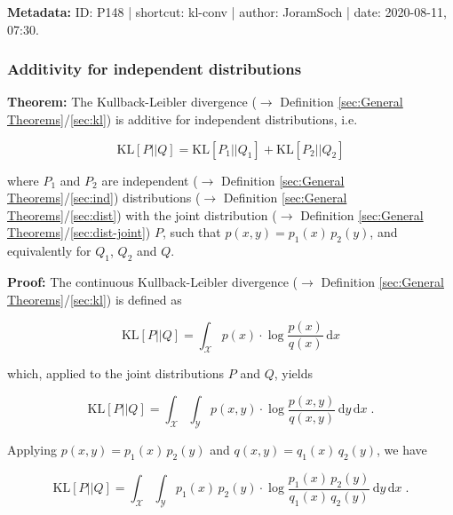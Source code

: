 \documentclass[a4paper,12pt,twoside]{book}
\begin{document}
\vspace{1em}
\textbf{Metadata:} ID: P148 | shortcut: kl-conv | author: JoramSoch | date: 2020-08-11, 07:30.
\vspace{1em}



\subsubsection[\textbf{Additivity for independent distributions}]{Additivity for independent distributions} \label{sec:kl-add}
\setcounter{equation}{0}

\textbf{Theorem:} The Kullback-Leibler divergence ($\rightarrow$ Definition \ref{sec:General Theorems}/\ref{sec:kl}) is additive for independent distributions, i.e.

\begin{equation} \label{eq:kl-add-KL-add}
\mathrm{KL}[P||Q] = \mathrm{KL}[P_1||Q_1] + \mathrm{KL}[P_2||Q_2]
\end{equation}

where $P_1$ and $P_2$ are independent ($\rightarrow$ Definition \ref{sec:General Theorems}/\ref{sec:ind}) distributions ($\rightarrow$ Definition \ref{sec:General Theorems}/\ref{sec:dist}) with the joint distribution ($\rightarrow$ Definition \ref{sec:General Theorems}/\ref{sec:dist-joint}) $P$, such that $p(x,y) = p_1(x) \, p_2(y)$, and equivalently for $Q_1$, $Q_2$ and $Q$.


\vspace{1em}
\textbf{Proof:} The continuous Kullback-Leibler divergence ($\rightarrow$ Definition \ref{sec:General Theorems}/\ref{sec:kl}) is defined as

\begin{equation} \label{eq:kl-add-KL}
\mathrm{KL}[P||Q] = \int_{\mathcal{X}} p(x) \cdot \log \frac{p(x)}{q(x)} \, \mathrm{d}x
\end{equation}

which, applied to the joint distributions $P$ and $Q$, yields

\begin{equation} \label{eq:kl-add-KL-s1}
\mathrm{KL}[P||Q] = \int_{\mathcal{X}} \int_{\mathcal{Y}} p(x,y) \cdot \log \frac{p(x,y)}{q(x,y)} \, \mathrm{d}y \, \mathrm{d}x \; .
\end{equation}

Applying $p(x,y) = p_1(x) \, p_2(y)$ and $q(x,y) = q_1(x) \, q_2(y)$, we have

\begin{equation} \label{eq:kl-add-KL-s2}
\mathrm{KL}[P||Q] = \int_{\mathcal{X}} \int_{\mathcal{Y}} p_1(x) \, p_2(y) \cdot \log \frac{p_1(x) \, p_2(y)}{q_1(x) \, q_2(y)} \, \mathrm{d}y \, \mathrm{d}x \; .
\end{equation}
\end{document}
